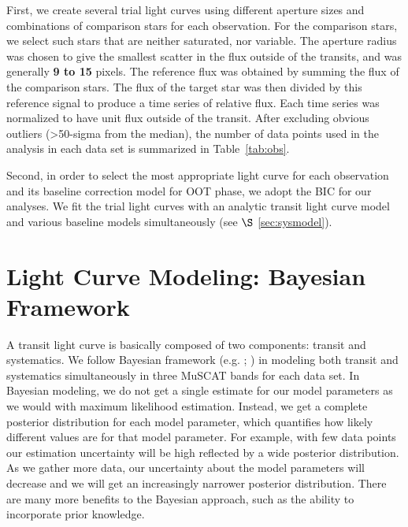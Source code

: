 First, we create several trial light curves using different aperture sizes and combinations of comparison stars for each observation. For the comparison stars, we select such stars that are neither saturated, nor variable. 
The aperture radius was chosen to give the smallest scatter in the flux outside of the transits, and was generally \textbf{9 to 15} pixels. %
The reference flux was obtained by summing the flux of the comparison stars. The flux of the target star was then divided by this reference signal to produce a time series of relative flux. Each time series was normalized to have unit flux outside of the transit. After excluding obvious outliers (>50-sigma from the median), the number of data points used in the analysis in each data set is summarized in Table~\ref{tab:obs}.

Second, in order to select the most appropriate light curve for each observation and its baseline correction model for OOT phase, we adopt the BIC for our analyses. We fit the trial light curves with an analytic transit light curve model and various baseline models simultaneously (see $\S$ \ref{sec:sysmodel}). 


\section{Light Curve Modeling: Bayesian Framework}
A transit light curve is basically composed of two components: transit and systematics. We follow Bayesian framework (e.g. \cite{Parviainen2017}; \cite{Diaz2017}) in modeling both transit and systematics simultaneously in three MuSCAT bands for each data set. %
In Bayesian modeling, we do not get a single estimate for our model parameters as we would with maximum likelihood estimation. Instead, we get a complete posterior distribution for each model parameter, which quantifies how likely different values are for that model parameter. For example, with few data points our estimation uncertainty will be high reflected by a wide posterior distribution. As we gather more data, our uncertainty about the model parameters will decrease and we will get an increasingly narrower posterior distribution. There are many more benefits to the Bayesian approach, such as the ability to incorporate prior knowledge.

